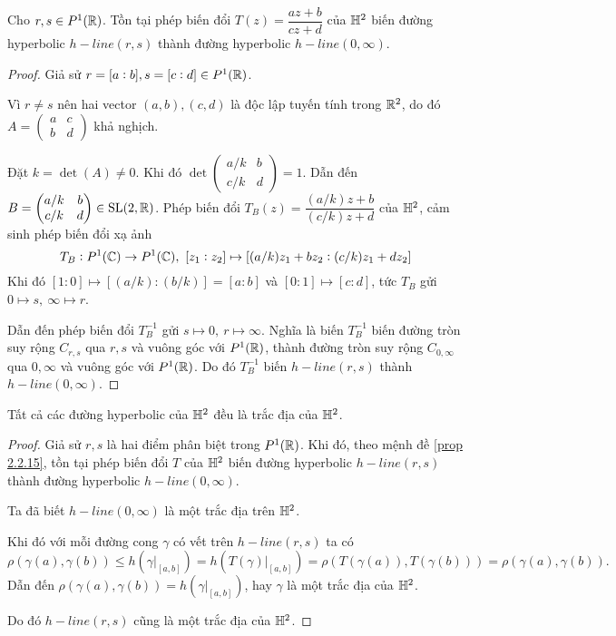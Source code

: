 \begin{prop}\label{prop 2.2.15}
    Cho $r,s \in P^1(\mathbb{R})$. Tồn tại phép biến đổi $T(z) = \dfrac{az+b}{cz+d}$ của $\mathbb{H}^2$ biến đường hyperbolic $h-line(r,s)$ thành đường hyperbolic $h-line(0,\infty)$.
\end{prop}
\begin{proof}
    Giả sử $r = [a:b], s = [c:d] \in P^1(\mathbb{R})$. 
    
    Vì $r \neq s$ nên hai vector $(a,b),(c,d)$ là độc lập tuyến tính trong $\mathbb{R}^2$, do đó $A = \begin{pmatrix}
        a & c\\
        b & d
    \end{pmatrix}$ khả nghịch. 
    
    Đặt $k = \det(A) \neq 0$. Khi đó $\det\begin{pmatrix}
        a/k & b\\
        c/k & d
    \end{pmatrix} = 1$. Dẫn đến $ B = \begin{pmatrix}
        a/k & b\\
        c/k & d
    \end{pmatrix} \in \operatorname{SL}(2,\mathbb{R})$. Phép biến đổi $T_B(z) = \dfrac{(a/k)z+b}{(c/k)z+d}$ của $\mathbb{H}^2$, cảm sinh phép biến đổi xạ ảnh
    \[T_B: P^1(\mathbb{C}) \to P^1(\mathbb{C}),~ [z_1:z_2]\mapsto [(a/k)z_1+bz_2:(c/k)z_1+dz_2]\]
    Khi đó $[1:0] \mapsto [(a/k):(b/k)] = [a:b]$ và $[0:1]\mapsto [c:d]$, tức $T_B$ gửi $0\mapsto s,~\infty \mapsto r$.

    Dẫn đến phép biến đổi $T_B^{-1}$ gửi $s \mapsto 0,~r\mapsto \infty$. Nghĩa là biến $T_B^{-1}$ biến đường tròn suy rộng $C_{r,s}$ qua $r,s$ và vuông góc với $P^1(\mathbb{R})$, thành đường tròn suy rộng $C_{0,\infty}$ qua $0,\infty$ và vuông góc với $P^1(\mathbb{R})$. Do đó $T_B^{-1}$ biến $h-line(r,s)$ thành $h-line(0,\infty)$.
\end{proof}
\begin{cor}\label{cor 2.2.16}
    Tất cả các đường hyperbolic của $\mathbb{H}^2$ đều là trắc địa của $\mathbb{H}^2$.
\end{cor}
\begin{proof}
    Giả sử $r,s$ là hai điểm phân biệt trong $P^1(\mathbb{R})$. Khi đó, theo mệnh đề \ref{prop 2.2.15}, tồn tại phép biến đổi $T$ của $\mathbb{H}^2$ biến đường hyperbolic $h-line(r,s)$ thành đường hyperbolic $h-line(0,\infty)$.

    Ta đã biết $h-line(0,\infty)$ là một trắc địa trên $\mathbb{H}^2$.
    
    Khi đó với mỗi đường cong $\gamma$ có vết trên $h-line(r,s)$ ta có
    \[\rho(\gamma(a),\gamma(b)) \leq h(\gamma|_{[a,b]}) = h(T(\gamma)|_{[a,b]}) = \rho(T(\gamma(a)),T(\gamma(b))) = \rho(\gamma(a),\gamma(b)).\]
    Dẫn đến $\rho(\gamma(a),\gamma(b)) =  h(\gamma|_{[a,b]})$, hay $\gamma$ là một trắc địa của $\mathbb{H}^2$. 
    
    Do đó $h-line(r,s)$ cũng là một trắc địa của $\mathbb{H}^2$.
\end{proof}
